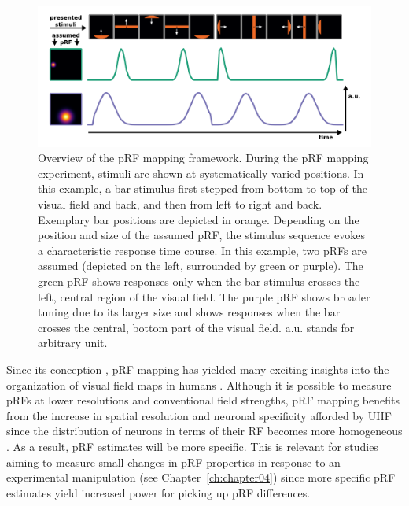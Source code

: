 \begin{figure}[!htb]
\centering
\includegraphics[width=\textwidth]{figures/chapter_01/fig2.png}
\caption{Overview of the pRF mapping framework. During the pRF mapping experiment, stimuli are shown at systematically varied positions. In this example, a bar stimulus first stepped from bottom to top of the visual field and back, and then from left to right and back. Exemplary bar positions are depicted in orange. Depending on the position and size of the assumed pRF, the stimulus sequence evokes a characteristic response time course. In this example, two pRFs are assumed (depicted on the left, surrounded by green or purple). The green pRF shows responses only when the bar stimulus crosses the left, central region of the visual field. The purple pRF shows broader tuning due to its larger size and shows responses when the bar crosses the central, bottom part of the visual field. a.u. stands for arbitrary unit.}
\label{fig:prf} 
\end{figure}

Since its conception \parencite{Dumoulin2008}, pRF mapping has yielded many exciting insights into the organization of visual field maps in humans \parencite{Amano2009, Winawer2010, Harvey2011, Zuiderbaan2012, Kay2013, Klein2014, Kay2015, Harvey2015, Fracasso2016}. Although it is possible to measure pRFs at lower resolutions and conventional field strengths, pRF mapping benefits from the increase in spatial resolution and neuronal specificity afforded by UHF since the distribution of neurons in terms of their RF becomes more homogeneous \parencite{DeMartino2016}. As a result, pRF estimates will be more specific. This is relevant for studies aiming to measure small changes in pRF properties in response to an experimental manipulation (see Chapter~\ref{ch:chapter04}) since more specific pRF estimates yield increased power for picking up pRF differences.

